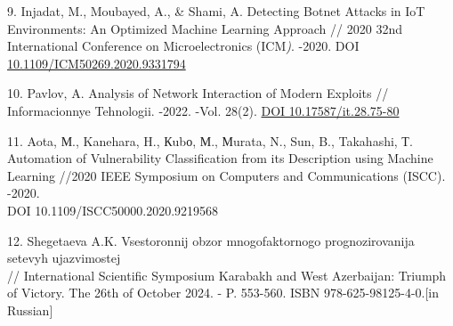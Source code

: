 \begin{references}
9. Injadat, M., Moubayed, A., \& Shami, A. Detecting Botnet Attacks in
IoT Environments: An Optimized Machine Learning Approach // 2020 32nd
International Conference on Microelectronics (ICM\emph{)}. -2020. DOI
\href{https://doi.org/10.1109/ICM50269.2020.9331794}{10.1109/ICM50269.2020.9331794}

10. Pavlov, A. Analysis of Network Interaction of Modern Exploits //
Informacionnye Tehnologii. -2022. -Vol. 28(2).
\href{https://doi.org/10.17587/it.28.75-80}{DOI 10.17587/it.28.75-80}

11. Aota, М., Kanehara, H., Кubо, М., Мurata, N., Sun, B., Takahashi, Т.
Automation of Vulnerability Classification from its Description using
Machine Learning //2020 IEEE Symposium on Computers and Communications
(ISCC). -2020.\\
DOI 10.1109/ISCC50000.2020.9219568

12. Shegetaeva A.K. Vsestoronnij obzor mnogofaktornogo prognozirovanija
setevyh ujazvimostej\\
// International Scientific Symposium Karabakh and West Azerbaijan:
Triumph of Victory. The 26th of October 2024. - P. 553-560. ISBN
978-625-98125-4-0.{[}in Russian{]}
\end{references}


